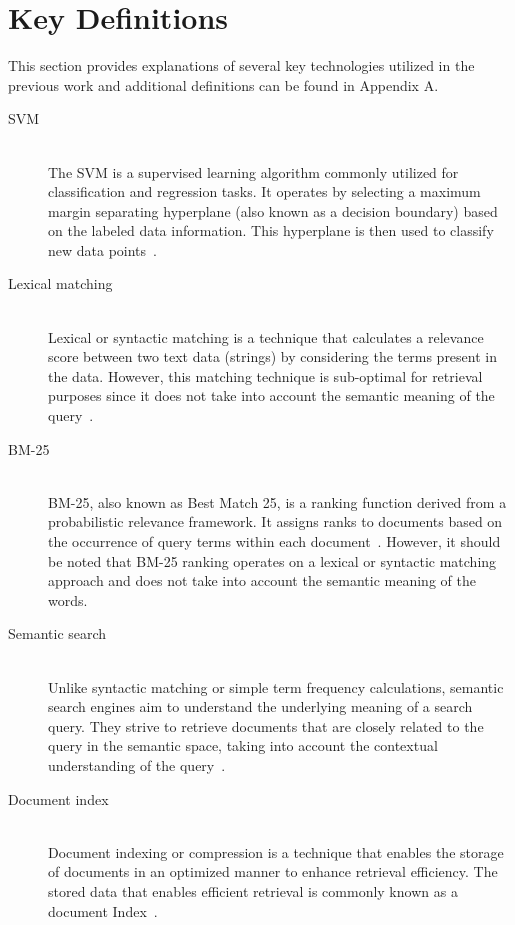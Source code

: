\section{Key Definitions}

This section provides explanations of several key technologies utilized in the previous work and additional definitions can be found in Appendix A.

\begin{description}
	
	\item[\ac{SVM}] \hfill \\ The \ac{SVM} is a supervised learning algorithm commonly utilized for classification and regression tasks. It operates by selecting a maximum margin separating hyperplane (also known as a decision boundary) based on the labeled data information. This hyperplane is then used to classify new data points~\cite{noble2006support}.
	
	\item[Lexical matching] \hfill \\ Lexical or syntactic matching is a technique that calculates a relevance score between two text data (strings) by considering the terms present in the data. However, this matching technique is sub-optimal for retrieval purposes since it does not take into account the semantic meaning of the query~\cite{kuzi2020leveraging}.
	
	\item[BM-25] \hfill \\ BM-25, also known as Best Match 25, is a ranking function derived from a probabilistic relevance framework. It assigns ranks to documents based on the occurrence of query terms within each document~\cite{amati_bm25_2009}. However, it should be noted that BM-25 ranking operates on a lexical or syntactic matching approach and does not take into account the semantic meaning of the words.
	
	\item[Semantic search] \hfill \\ Unlike syntactic matching or simple term frequency calculations, semantic search engines aim to understand the underlying meaning of a search query. They strive to retrieve documents that are closely related to the query in the semantic space, taking into account the contextual understanding of the query~\cite{dong2008survey}.
	
	\item[Document index] \hfill \\ Document indexing or compression is a technique that enables the storage of documents in an optimized manner to enhance retrieval efficiency. The stored data that enables efficient retrieval is commonly known as a document Index~\cite{ziviani2000compression}.
	

\end{description}

